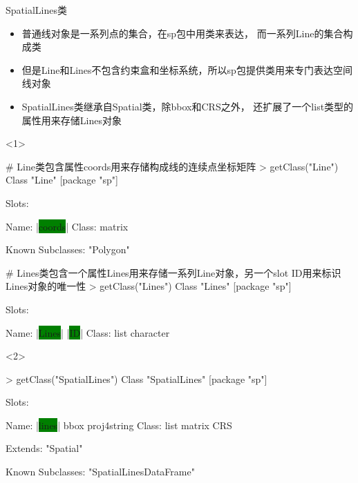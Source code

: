 \begin{frame}[t,fragile]{\subsecname}{SpatialLines类}
\begin{itemize}
\item<1-> 普通线对象是一系列点的集合，在sp包中用类来表达，
而一系列Line的集合构成类
\item<2-> 但是Line和Lines不包含约束盒和坐标系统，所以sp包提供类用来专门表达空间线对象
\item<2-> SpatialLines类继承自Spatial类，除bbox和CRS之外，
还扩展了一个list类型的属性用来存储Lines对象
\end{itemize}

\begin{overlayarea}{\textwidth}{\textheight}
\begin{onlyenv}<1>
\begin{rcode}
# Line类包含属性coords用来存储构成线的连续点坐标矩阵
> getClass("Line")
Class "Line" [package "sp"]

Slots:
             
Name:  |\colorbox{green}{coords}|
Class: matrix

Known Subclasses: "Polygon"

# Lines类包含一个属性Lines用来存储一系列Line对象，另一个slot ID用来标识Lines对象的唯一性
> getClass("Lines")
Class "Lines" [package "sp"]

Slots:
                          
Name:      |\colorbox{green}{Lines}|        |\colorbox{green}{ID}|
Class:      list character
\end{rcode}
\end{onlyenv}

\begin{onlyenv}<2>
\begin{rcode}
> getClass("SpatialLines")
Class "SpatialLines" [package "sp"]

Slots:
                                          
Name:        |\colorbox{green}{lines}|        bbox proj4string
Class:        list      matrix         CRS

Extends: "Spatial"

Known Subclasses: "SpatialLinesDataFrame"
\end{rcode}
\end{onlyenv}
\end{overlayarea}
\end{frame}

